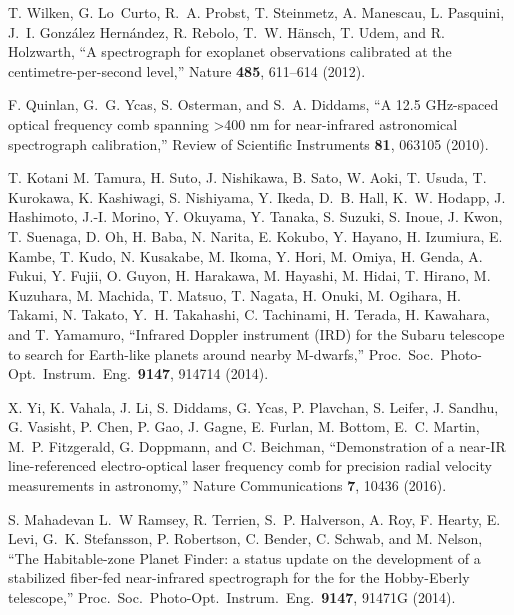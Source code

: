 \documentclass[10pt]{article}
\begin{document}
\begin{thebibliography}{21}
  T. Wilken, G. Lo~Curto, R.~A. Probst,	T. Steinmetz, A. Manescau, L. Pasquini, J.~I. Gonz{\'a}lez Hern{\'a}ndez, R. Rebolo, T.~W. H{\"a}nsch, T. Udem, and R. Holzwarth, ``A spectrograph for exoplanet observations calibrated at the centimetre-per-second level,'' Nature {\bf 485}, 611--614 (2012).
  
F. Quinlan, G.~G. Ycas, S. Osterman, and S.~A. Diddams, ``A 12.5 GHz-spaced optical frequency comb spanning >400 nm for near-infrared astronomical spectrograph calibration,'' Review of Scientific Instruments {\bf 81}, 063105 (2010).

  T. Kotani M. Tamura, H. Suto, J. Nishikawa, B. Sato, W. Aoki, T. Usuda, T. Kurokawa, K. Kashiwagi, S. Nishiyama, Y. Ikeda, D.~B. Hall, K.~W. Hodapp, J. Hashimoto, J.-I. Morino, Y. Okuyama, Y. Tanaka, S. Suzuki, S. Inoue, J. Kwon, T. Suenaga, D. Oh, H. Baba, N. Narita, E. Kokubo, Y. Hayano, H. Izumiura, E. Kambe, T. Kudo, N. Kusakabe, M. Ikoma, Y. Hori, M. Omiya, H. Genda, A. Fukui, Y. Fujii, O. Guyon, H. Harakawa, M. Hayashi, M. Hidai, T. Hirano, M. Kuzuhara, M. Machida, T. Matsuo, T. Nagata, H. Onuki, M. Ogihara, H. Takami, N. Takato, Y.~H. Takahashi, C. Tachinami, H. Terada, H. Kawahara, and T. Yamamuro, ``Infrared Doppler instrument (IRD) for the Subaru telescope to search for Earth-like planets around nearby M-dwarfs,'' Proc.\ Soc.\ Photo-Opt.\ Instrum.\ Eng.\ {\bf 9147}, 914714 (2014).
 
  X. Yi, K. Vahala,	J. Li,	S. Diddams,	G. Ycas, P. Plavchan, S. Leifer, J. Sandhu, G. Vasisht, P. Chen, P. Gao, J. Gagne, E. Furlan, M. Bottom, E.~C. Martin, M.~P. Fitzgerald, G. Doppmann, and C. Beichman, ``Demonstration of a near-IR line-referenced electro-optical laser frequency comb for precision radial velocity measurements in astronomy,'' Nature Communications {\bf 7}, 10436 (2016).

  S. Mahadevan L.~W Ramsey, R. Terrien,
   S.~P. Halverson, A. Roy, F. Hearty, E. Levi, G.~K. Stefansson, P. Robertson, C. Bender, C. Schwab, and M. Nelson, ``The Habitable-zone Planet Finder: a status update on the development of a stabilized fiber-fed near-infrared spectrograph for the for the Hobby-Eberly telescope,'' Proc.\ Soc.\ Photo-Opt.\ Instrum.\ Eng.\ {\bf 9147}, 91471G (2014).
 

\end{thebibliography}
\end{document}
